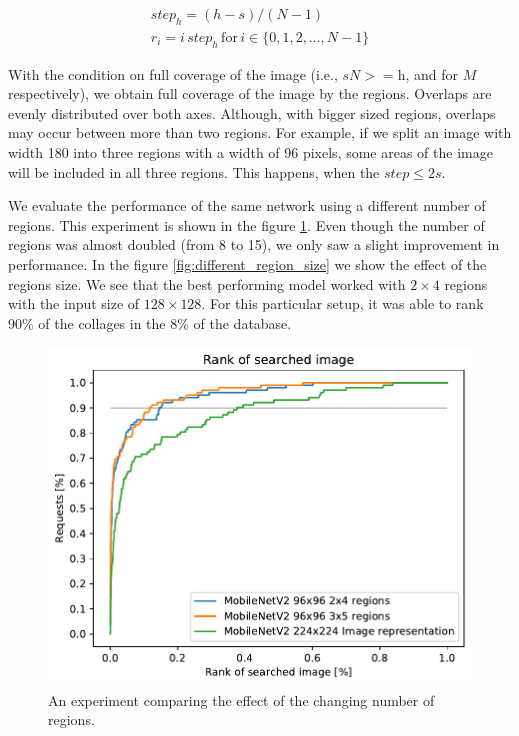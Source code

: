 \begin{align*}
step_h = (h - s) / (N - 1) \\
r_i = {i \, step_h\,\text{for}\,i \in \{0, 1, 2, \dots, N - 1\}}
\end{align*}

With the condition on full coverage of the image (i.e., \(s N >= \text{h}\), and for $M$ respectively), we obtain full coverage of the image by the regions. Overlaps are evenly distributed over both axes. Although, with bigger sized regions, overlaps may occur between more than two regions. For example, if we split an image with width 180 into three regions with a width of 96 pixels, some areas of the image will be included in all three regions. This happens, when the $step \leq 2 s$.

We evaluate the performance of the same network using a different number of regions. This experiment is shown in the figure \ref{fig:different_number_regions}. Even though the number of regions was almost doubled (from 8 to 15), we only saw a slight improvement in performance. In the figure \ref{fig:different_region_size} we show the effect of the regions size. We see that the best performing model worked with $2\times4$ regions with the input size of $128\times128$. For this particular setup, it was able to rank 90\% of the collages in the 8\% of the database.

\begin{figure}
\centering
\includegraphics[width=0.8\linewidth]{graphs/0c36458e4a7754f349e4dd02e823acc5f192f0aaa42647313045530525f3db19.pdf}
\caption{An experiment comparing the effect of the changing number of regions.}
\label{fig:different_number_regions}
\end{figure}

